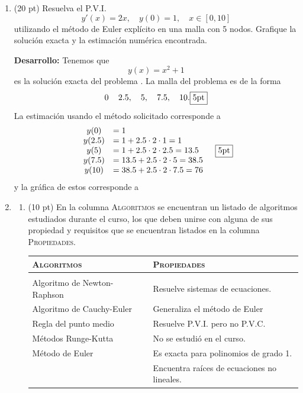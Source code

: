 \documentclass[11pt]{article}
\begin{document}
\begin{enumerate}
\newpage
\item  (20 pt) Resuelva el P.V.I.
$$ 
y'(x)=2x, \quad y(0)=1, \quad x\in[0,10]
$$
utilizando el método de Euler explícito en una malla con 5 nodos. Grafique la soluci\'on exacta y la estimaci\'on num\'erica encontrada.

\textbf{Desarrollo:} Tenemos que 
$$
y(x)=x^2+1
$$
es la soluci\'on exacta del problema \fbox{0 pt} . La malla del problema es de la forma
$$
0\, \quad 2.5, \quad 5, \quad 7.5, \quad 10. \fbox{5pt}
$$
La estimaci\'on usando el m\'etodo solicitado corresponde a 
$$
\begin{array}{cl}
y(0)	&=1 \\
y(2.5)	&= 1 + 2.5 \cdot 2 \cdot 1 		=1 		\\
y(5)	&= 1 + 2.5 \cdot 2 \cdot 2.5 	=13.5 	\\
y(7.5)	&= 13.5 + 2.5 \cdot 2 \cdot 5 	=38.5 	\\
y(10)	&= 38.5 + 2.5 \cdot 2 \cdot 7.5 =76 	\\
\end{array}\quad \fbox{5pt}
$$
y la gr\'afica de estos corresponde a
    \begin{center}
    \end{center}


\newpage
\item  \begin{enumerate}
\item (10 pt) En la columna \textsc{Algoritmos} se encuentran un listado de algoritmos estudiados durante el curso, los que deben unirse con alguna de sus propiedad y requisitos que se encuentran listados en la columna \textsc{Propiedades}.
\begin{center}
	\begin{tabular}{||p{4cm}|p{7cm}|p{4cm}||}
    \hline \hline
	\textsc{Algoritmos}	& & \textsc{Propiedades}    \\ \hline & &\\ \hline  
    Algoritmo de Newton-Raphson & & Resuelve sistemas de ecuaciones. \\ \hline
    Algoritmo de Cauchy-Euler	& & Generaliza el método de Euler\\ \hline
    Regla del punto medio		& & Resuelve P.V.I. pero no P.V.C.\\ \hline
    M\'etodos Runge-Kutta		& & No se estudi\'o en el curso.\\ \hline
	M\'etodo de Euler			& & Es exacta para polinomios de grado 1.\\ \hline
    							& & Encuentra ra\'ices de ecuaciones no lineales.\\ \hline
   \end{tabular}
\end{center}


\end{enumerate}
\end{enumerate}
\end{document}
